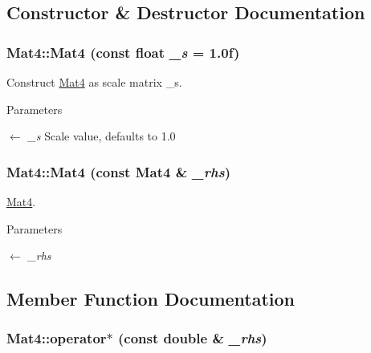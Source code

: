 \subsection{Constructor \& Destructor Documentation}
\hypertarget{classMat4_ab3c26812d63c39eaf57ef25cdda9c24c}{
\subsubsection[{Mat4}]{\setlength{\rightskip}{0pt plus 5cm}Mat4::Mat4 (const float {\em \_\-s} = {\ttfamily 1.0f})}}
\label{classMat4_ab3c26812d63c39eaf57ef25cdda9c24c}


Construct \hyperlink{classMat4}{Mat4} as scale matrix \_\-s. 
\begin{DoxyParams}{Parameters}
\item[\mbox{$\leftarrow$} {\em \_\-s}]Scale value, defaults to 1.0 \end{DoxyParams}
\hypertarget{classMat4_a962a2d2ba18f96eba15342175237e55c}{
\subsubsection[{Mat4}]{\setlength{\rightskip}{0pt plus 5cm}Mat4::Mat4 (const {\bf Mat4} \& {\em \_\-rhs})}}
\label{classMat4_a962a2d2ba18f96eba15342175237e55c}


\hyperlink{classMat4}{Mat4}. 
\begin{DoxyParams}{Parameters}
\item[\mbox{$\leftarrow$} {\em \_\-rhs}]\end{DoxyParams}


\subsection{Member Function Documentation}
\hypertarget{classMat4_a352383553a3abb84b876e222b355be6a}{
\subsubsection[{operator$\ast$}]{ Mat4::operator$\ast$ (const double \& {\em \_\-rhs})}}
\label{classMat4_a352383553a3abb84b876e222b355be6a}


